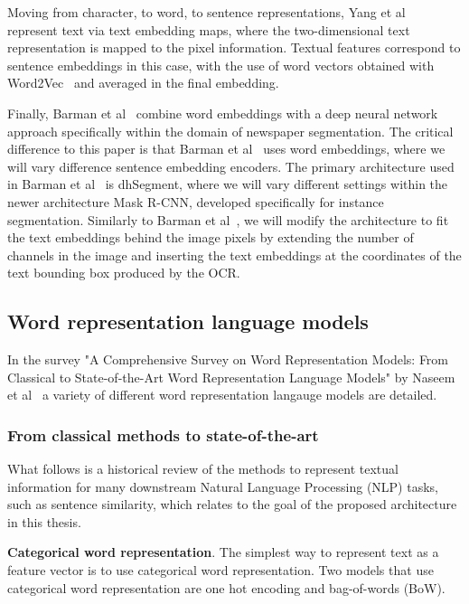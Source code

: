 \documentclass[oneside, english, bibtex]{kththesis}
\begin{document}
Moving from character, to word, to sentence representations, Yang et al~\cite{DBLP:journals/corr/YangYAKKG17} represent text via text embedding maps, where the two-dimensional text representation is mapped to the pixel information. Textual features correspond to sentence embeddings in this case, with the use of word vectors obtained with Word2Vec~\cite{mikolov2013} and averaged in the final embedding.

Finally, Barman et al~\cite{jdmdh:7097} combine word embeddings with a deep neural network approach specifically within the domain of newspaper segmentation. The critical difference to this paper is that Barman et al~\cite{jdmdh:7097} uses word embeddings, where we will vary difference sentence embedding encoders. The primary architecture used in Barman et al~\cite{jdmdh:7097} is dhSegment, where we will vary different settings within the newer architecture Mask R-CNN, developed specifically for instance segmentation. Similarly to Barman et al~\cite{jdmdh:7097}, we will modify the architecture to fit the text embeddings behind the image pixels by extending the number of channels in the image and inserting the text embeddings at the coordinates of the text bounding box produced by the OCR.

\subsection{Word representation language models}
\label{sec:langrep}

In the survey "A Comprehensive Survey on Word Representation Models: From Classical to State-of-the-Art Word Representation Language Models" by Naseem et al~\cite{10.1145/3434237} a variety of different word representation langauge models are detailed.

\subsubsection{From classical methods to state-of-the-art}

What follows is a historical review of the methods to represent textual information for many downstream Natural Language Processing (NLP) tasks, such as sentence similarity, which relates to the goal of the proposed architecture in this thesis. 

\textbf{Categorical word representation}. The simplest way to represent text as a feature vector is to use categorical word representation. Two models that use categorical word representation are one hot encoding and bag-of-words (BoW). 
\end{document}

